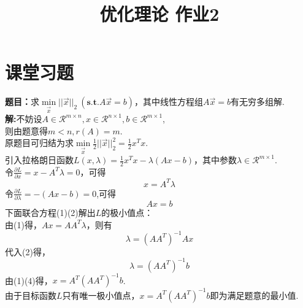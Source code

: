 \documentclass{article}
\title{优化理论 作业2}
\author{}
\date{}
\begin{document}
\section*{课堂习题}
\noindent
\textbf{题目：}求$\mathop{min}\limits_{\vec{x}}\vert\vert\vec{x}\vert\vert_2\ (\textbf{s.t.}A\vec{x}=b)$，其中线性方程组$A\vec{x}=b$有无穷多组解.\\
\textbf{解:}不妨设$A\in\mathcal{R}^{m\times n},x\in\mathcal{R}^{n\times 1},b\in\mathcal{R}^{m\times 1}$,\\
则由题意得$m<n,r(A)=m$.\\
原题目可归结为求$\mathop{min}\limits_{\vec{x}}\frac{1}{2}\vert\vert\vec{x}\vert\vert_2^2 =\frac{1}{2}x^Tx$.\\
引入拉格朗日函数$L(x,\lambda)=\frac{1}{2}x^Tx-\lambda(Ax-b)$，其中参数$\lambda\in\mathcal{R}^{m\times 1}$.\\
令$\frac{\partial L}{\partial x}=x - A^T \lambda=0$，可得
\begin{equation}
    x=A^T\lambda
\end{equation}
令$\frac{\partial L}{\partial \lambda}=-(Ax-b)=0$,可得
\begin{equation}
    Ax=b
\end{equation}
下面联合方程(1)(2)解出$L$的极小值点：\\
由(1)得，$Ax=AA^T\lambda$，则有\begin{equation}
    \lambda = (AA^T)^{-1}Ax
\end{equation}
代入(2)得，\begin{equation}
    \lambda = (AA^T)^{-1}b
\end{equation}
由(1)(4)得，$x=A^T(AA^T)^{-1}b$.\\
由于目标函数$L$只有唯一极小值点，$x=A^T(AA^T)^{-1}b$即为满足题意的最小值.
\end{document}
